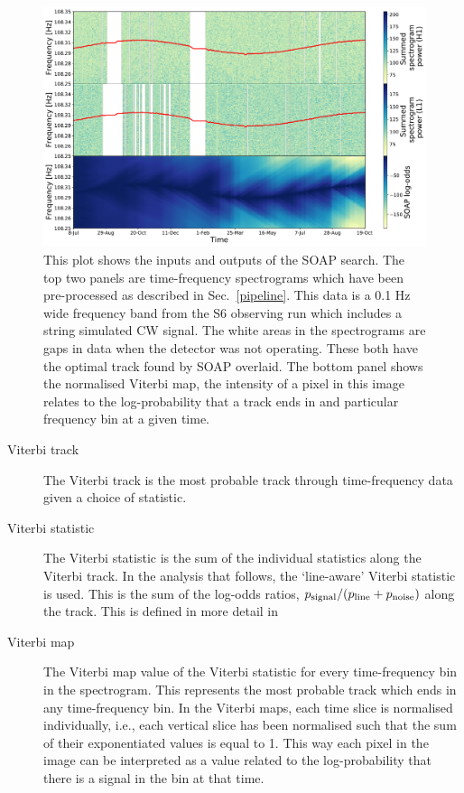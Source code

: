 \begin{figure}[h]
	\includegraphics[scale=0.43]{C4_cnn/two_vit_example.pdf}
	\caption{\label{soap:viterbiplot} This plot shows the inputs and outputs of the
		SOAP search. The top two panels are time-frequency spectrograms which have been pre-processed as described in Sec.~\ref{pipeline}. This
		data is a 0.1 Hz wide frequency band from the S6 observing run \cite{}  which includes a string simulated \ac{CW} signal. The white areas in the spectrograms are gaps in data when the detector was not operating. These both have the
		optimal track found by SOAP overlaid. The bottom panel shows the normalised Viterbi map, the intensity of a
		pixel in this image relates to the log-probability that a track ends in and
		particular frequency bin at a given time.}
\end{figure}

%
\begin{description} 
	\item [Viterbi track] The Viterbi track is the most probable track through time-frequency data given a choice of statistic. 
	\item [Viterbi statistic] The Viterbi statistic is the sum of the individual statistics along the Viterbi track. In the analysis that follows, the `line-aware' Viterbi statistic is used. 
	This is the sum of the log-odds ratios, $p_{\rm signal}/(p_{\rm line} + p_{\rm noise})$ along the track. This is defined in more detail in \cite{bayley2019SOAPGeneralised}
	\item [Viterbi map]
	The Viterbi map value of the Viterbi statistic for every time-frequency bin in the spectrogram. 
	This represents the most probable track which ends in any time-frequency bin.
	In the Viterbi maps, each time slice is normalised individually, i.e., each
	vertical slice has been normalised such that the sum of their exponentiated
	values is equal to 1. This way each pixel in the image can be interpreted as a
	value related to the log-probability that there is a signal in the bin at that
	time.
\end{description}


